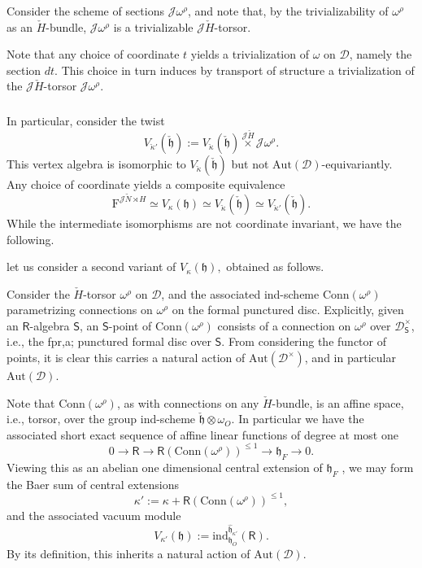 \documentclass{amsart}
\theoremstyle{definition}
\newcommand{\fh}{\mathfrak{h}}
\newcommand{\diglet}{\mathrm{F}}
\newcommand{\Fun}{\Ring}
\newcommand{\sss}{\subsubsection{}}
\newcommand{\D}{\sD}
\newcommand{\sD}{\mathscr{D}}
\newcommand{\Sing}{\mathsf{S}}
\newcommand{\on}{\mathrm}
\newcommand{\Ring}{\mathsf{R}}
\newcommand{\Jet}{\mathscr{J}}
\newcommand{\ckappa}{\check{\kappa}}
\numberwithin{equation}{section}
\begin{document}
Consider the scheme of sections $\Jet \omega^\rho$, and note that, by the trivializability of $\omega^\rho$ as an $\check{H}$-bundle, $\Jet \omega^\rho$ is a trivializable $\Jet\check{H}$-torsor. 

Note that any choice of coordinate $t$ yields a trivialization of $\omega$ on $\D$, namely the section $dt$. This choice in turn induces by transport of structure a trivialization of the $\Jet\check{H}$-torsor $\Jet \omega^\rho$. 

\sss{} In particular,  consider the twist 
$$V_{\ckappa'}(\check{\mathfrak{h}}) := V_{\ckappa}(\check{\mathfrak{h}}) \overset{\Jet\check{H}} \times\Jet \omega^\rho.$$
{ This vertex algebra is isomorphic to $V_{\check{\kappa}}(\check{\mathfrak{h}})$ but not $\on{Aut}(\D)$-equivariantly.}
Any choice of coordinate yields a composite equivalence 
\begin{equation} \label{e:cheat} \diglet^{\Jet \tilde{N}\rtimes H} \simeq V_\kappa(\fh) \simeq V_{\ckappa}(\check{\mathfrak{h}}) \simeq V_{\ckappa'}(\check{\mathfrak{h}}).\end{equation}
While the intermediate isomorphisms are not coordinate invariant, we have the following. 

\iffalse 




let us consider a second variant of
$V_{\kappa}(\fh),$ 
obtained as follows. 

Consider the $\check{H}$-torsor $\omega^{\rho}$ on $\D$, and the associated ind-scheme  $\on{Conn}(\omega^{\rho})$ parametrizing connections on $\omega^{\rho}$ on the formal punctured disc. Explicitly, given an $\Ring$-algebra $\Sing$, an $\Sing$-point of $\on{Conn}(\omega^{\rho})$ consists of a connection on $\omega^{\rho}$ over $\D_\Sing^\times$, i.e., the fpr,a; punctured formal disc over $\Sing$. From considering the functor of points, it is clear this carries a natural action of $\on{Aut}(\D^\times)$, and in particular $\on{Aut}(\D)$. 


Note that $\on{Conn}(\omega^\rho)$, as with connections on any $\check{H}$-bundle, is an affine space, i.e., torsor, over the group ind-scheme $\check{\fh} \otimes \omega_O$. In particular we have the associated short exact sequence of affine linear functions of degree at most one 
$$0 \rightarrow \Ring \rightarrow \Fun(\on{Conn}(\omega^{\rho}))^{\leqslant 1} \rightarrow \fh_F \rightarrow 0.$$
Viewing this as an abelian one dimensional central extension of $\fh_F$ , we may form the Baer sum of central extensions 
$$\kappa' := \kappa + \Fun(\on{Conn}(\omega^{\rho}))^{\leqslant 1},$$
and the associated vacuum module 
$$V_{\kappa'}(\fh) := \on{ind}_{\fh_O}^{\widehat{\fh}_{\kappa'}}(\Ring).$$
By its definition, this inherits a natural action of $\on{Aut}(\D).$  
\end{document}
